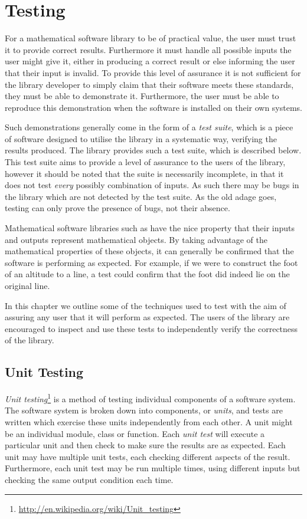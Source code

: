 \chapter{Testing}\label{chap:test}

For a mathematical software library to be of practical value, the user must trust it to provide correct results.
Furthermore it must handle all possible inputs the user might give it, either in producing a correct result or else informing the user that their input is invalid.
To provide this level of assurance it is not sufficient for the library developer to simply claim that their software meets these standards, they must be able to demonstrate it.
Furthermore, the user must be able to reproduce this demonstration when the software is installed on their own systems.

Such demonstrations generally come in the form of a \emph{test suite}, which is a piece of software designed to utilise the library in a systematic way, verifying the results produced.
The \pygeom library provides such a test suite, which is described below.
This test suite aims to provide a level of assurance to the users of the library, however it should be noted that the suite is necessarily incomplete, in that it does not test \emph{every} possibly combination of inputs.
As such there may be bugs in the library which are not detected by the test suite.
As the old adage goes, testing can only prove the presence of bugs, not their absence.

Mathematical software libraries such as \pygeom have the nice property that their inputs and outputs represent mathematical objects.
By taking advantage of the mathematical properties of these objects, it can generally be confirmed that the software is performing as expected.
For example, if we were to construct the foot of an altitude to a line, a test could confirm that the foot did indeed lie on the original line.

In this chapter we outline some of the techniques used to test \pygeom with the aim of assuring any user that it will perform as expected.
The users of the library are encouraged to inspect and use these tests to independently verify the correctness of the library.

\section{Unit Testing}

\emph{Unit testing}\footnote{\url{http://en.wikipedia.org/wiki/Unit_testing}} is a method of testing individual components of a software system.
The software system is broken down into components, or \emph{units}, and tests are written which exercise these units independently from each other.
A unit might be an individual module, class or function.
Each \emph{unit test} will execute a particular unit and then check to make sure the results are as expected.
Each unit may have multiple unit tests, each checking different aspects of the result.
Furthermore, each unit test may be run multiple times, using different inputs but checking the same output condition each time.

